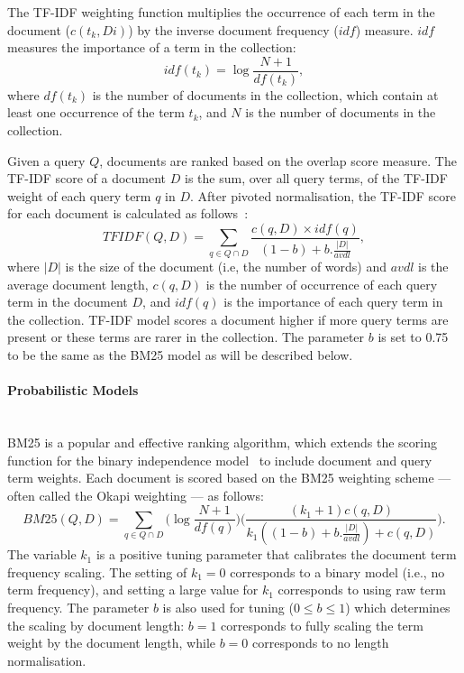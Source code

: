 The TF-IDF weighting function multiplies the occurrence of each term in the document ($ c(t_{k},Di)$)
by the inverse document frequency ($ idf $) measure. $ idf $ measures the importance of a term in the collection: 
\begin{equation}
idf(t_{k})=\log\frac{N+1}{df(t_{k})},
\label{eq:idf}
\end{equation}
where $ df(t_{k}) $ is the number of documents in the collection, which contain at least one occurrence of the term $ t_{k} $, and $ N $ is the number of documents in the collection. 

Given a query $Q$, documents are ranked based on the overlap score measure. The TF-IDF score of a document $D$ is the sum, over all query terms, of the TF-IDF weight of each query term $q$ in $D$. After pivoted normalisation, the TF-IDF score for each document is calculated as follows~\citep{bache2010improving}:
\begin{equation}
TFIDF(Q,D)=\sum\limits_{q \in Q\cap D}\frac{c(q,D)\times idf(q)}{(1-b)+b.\frac{|D|}{avdl}},
\label{eq:tfidf}
\end{equation}
where $ |D| $ is the size of the document (i.e, the number of words) and $ avdl $ is the average document length, $ c(q,D)$ is the number of occurrence of each query term in the document $D$, and $idf(q)$ is the importance of each query term in the collection. TF-IDF model scores a document higher if more query terms are present or these terms are rarer in the collection. The parameter $ b $ is set to 0.75 to be the same as the BM25 model as will be described below.
\paragraph{Probabilistic Models}
\ \\
BM25 is a popular and effective ranking algorithm, which extends the scoring function for the binary independence model~\citep[p. 232]{manning2008introduction} to include document and query term weights. Each document is scored based on the BM25 weighting scheme --- often called the Okapi weighting --- as follows:
\begin{equation}
BM25(Q,D)=\sum\limits_{q \in Q\cap D}\Bigg(\log\frac{N+1}{df(q)}\Bigg)\Bigg(\frac{(k_{1}+1)c(q,D)}{k_{1}((1-b)+b.\frac{|D|}{avdl})+c(q,D)}\Bigg).
\label{eq:idfbm25}
\end{equation}
The variable $ k_{1} $ is a positive tuning parameter that calibrates the document term frequency scaling. The setting of $ k_{1}=0 $ corresponds to a binary model (i.e., no term frequency), and setting a large value for $ k_{1} $ corresponds to using raw term
frequency. The parameter $ b $ is also used for tuning ($ 0 \leq b \leq 1 $) which determines the scaling by document length: $ b = 1 $ corresponds to fully scaling the term weight by the document length, while $ b = 0 $ corresponds to no length normalisation. 

